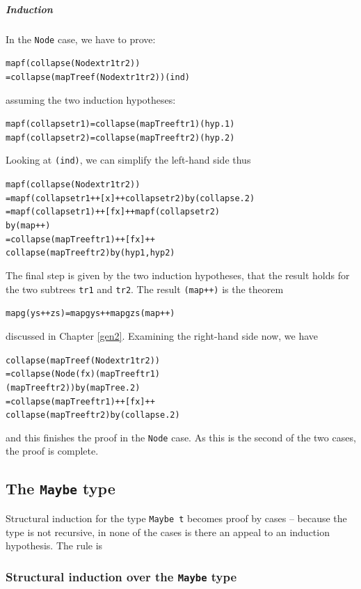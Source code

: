 \subparagraph{Induction} 
In the \texttt{Node} case, we have to prove:
\begin{alltt}
map f (collapse (Node x tr1 tr2)) 
  = collapse (mapTree f (Node x tr1 tr2))\hfill(ind)
\end{alltt}
assuming the two induction hypotheses:
\begin{alltt}
map f (collapse tr1) = collapse (mapTree f tr1) \hfill (hyp.1)
map f (collapse tr2) = collapse (mapTree f tr2)\hfill (hyp.2)
\end{alltt}
Looking at \texttt{(ind)}, we can simplify the left-hand side thus
\begin{alltt}
map f (collapse (Node x tr1 tr2))
  = map f (collapse tr1 ++ [x] ++ collapse tr2)\hfill{\rm by} (collapse.2)
  = map f (collapse tr1) ++ [f x] ++ map f (collapse tr2)
       \hfill{\rm by} (map++)
  = collapse (mapTree f tr1) ++ [f x] ++ 
    collapse (mapTree f tr2)\hfill{\rm by} (hyp1,hyp2) 
\end{alltt}
The final step is given by the two induction hypotheses, that the result
holds for the two subtrees \texttt{tr1} and \texttt{tr2}. The result \texttt{(map++)} is the
theorem
\begin{alltt}
map g (ys++zs) = map g ys ++ map g zs \hfill (map++)
\end{alltt}
discussed in Chapter \ref{gen2}. Examining the right-hand side now, we have
\begin{alltt}
collapse (mapTree f (Node x tr1 tr2))
  = collapse (Node (f x) (mapTree f tr1) 
                         (mapTree f tr2))\hfill{\rm by} (mapTree.2)
  = collapse (mapTree f tr1) ++ [f x] ++ 
    collapse (mapTree f tr2)\hfill{\rm by} (collapse.2)
\end{alltt}
and this finishes the proof in the \texttt{Node} case. As this is the
second
of the two cases, the proof is complete. 
\blackbox

\subsection*{The \texttt{Maybe} type}

Structural induction for the type \texttt{Maybe t} becomes proof by cases --
because the type is not recursive, in none of the cases is there an appeal to
an induction hypothesis. The rule is

\subsubsection*{Structural induction over the \texttt{Maybe} type} 

